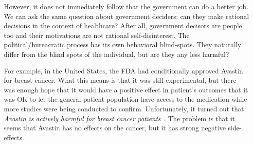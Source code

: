 However, it does not immediately follow that the government can do a better
job. We can ask the same question about government deciders: can they make
rational decisions in the context of healthcare? After all, government decisors
are people too and their motivations are not rational self-disinterest. The
political/bureacratic process has its own behavioral blind-spots. They
naturally differ from the blind spots of the individual, but are they any less
harmful?

For example, in the United States, the FDA had conditionally approved Avastin
for breast cancer. What this means is that it was still experimental, but there
was enough hope that it would have a positive effect in patient's outcomes that
it was OK to let the general patient population have access to the medication
while more studies were being conducted to confirm. Unfortunately, it turned
out that \emph{Avastin is actively harmful for breast cancer
patients}~\cite{avastin-harfmul}. The problem is that it seems that Avastin has
no effects on the cancer, but it has strong negative side-effects.

